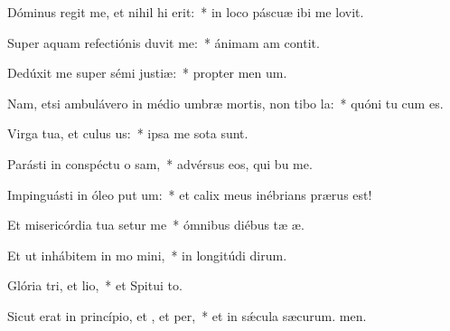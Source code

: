 \item Dóminus regit me, et nihil hi erit:~* in loco páscuæ ibi me lovit.
\item Super aquam refectiónis duvit me:~* ánimam am contit.
\item Dedúxit me super sémi justiæ:~* propter men um.
\item Nam, etsi ambulávero in médio umbræ mortis, non tibo la:~* quóni tu cum es.
\item Virga tua, et culus us:~* ipsa me sota sunt.
\item Parásti in conspéctu o sam,~* advérsus eos, qui bu me.
\item Impinguásti in óleo put um:~* et calix meus inébrians  prærus est!
\item Et misericórdia tua setur me~* ómnibus diébus tæ æ.
\item Et ut inhábitem in mo mini,~* in longitúdi dirum.
\item Glória tri, et lio,~* et Spitui to.
\item Sicut erat in princípio, et , et per,~* et in sǽcula sæcurum. men.
